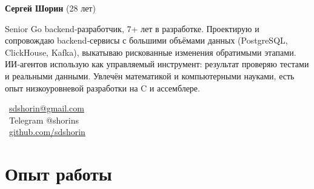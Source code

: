 \documentclass{dodiresume}
\begin{document}
\begin{minipage}{0.7\textwidth}
\begin{flushleft}
\LARGE \textbf{\textcolor{namecolor}{Сергей Шорин}} \normalsize{(28 лет)}

\vspace{0.3cm}
Senior Go backend‑разработчик, 7+ лет в разработке. Проектирую и сопровождаю backend‑сервисы с большими объёмами данных (PostgreSQL, ClickHouse, Kafka), выкатываю рискованные изменения обратимыми этапами. ИИ‑агентов использую как управляемый инструмент: результат проверяю тестами и реальными данными. Увлечён математикой и компьютерными науками, есть опыт низкоуровневой разработки на C и ассемблере.
\end{flushleft}
\end{minipage}
\begin{minipage}{0.28\textwidth}
\begin{flushright}
\faEnvelope\ \href{mailto:sdshorin@gmail.com}{sdshorin@gmail.com} \\
\faPaperPlane\ Telegram @shorins \\
\faGithub\ \href{https://github.com/sdshorin}{github.com/sdshorin}
\end{flushright}
\end{minipage}

\vspace{0.1cm}

\section{Опыт работы}

\end{document}
